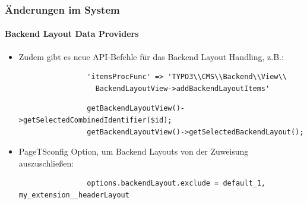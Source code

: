 \begin{frame}[fragile]
	\frametitle{Änderungen im System}
	\framesubtitle{Backend Layout Data Providers}

	\begin{itemize}
		\item Zudem gibt es neue API-Befehle für das Backend Layout Handling, z.B.:

			\begin{lstlisting}
				'itemsProcFunc' => 'TYPO3\\CMS\\Backend\\View\\
				  BackendLayoutView->addBackendLayoutItems'
			\end{lstlisting}

			\begin{lstlisting}
				getBackendLayoutView()->getSelectedCombinedIdentifier($id);
				getBackendLayoutView()->getSelectedBackendLayout();
			\end{lstlisting}

		\item PageTSconfig Option, um Backend Layouts von der Zuweisung auszuschließen:

			\begin{lstlisting}
				options.backendLayout.exclude = default_1, my_extension__headerLayout
			\end{lstlisting}

	\end{itemize}

\end{frame}


